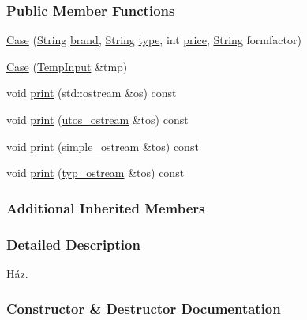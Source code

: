 \subsubsection*{Public Member Functions}
\begin{DoxyCompactItemize}
\item 
\mbox{\hyperlink{class_case_a0d953adffc664636549235d729f13260}{Case}} (\mbox{\hyperlink{class_string}{String}} \mbox{\hyperlink{class_part_ae06f2fdeb7fbbdb229a7aca151f3e341}{brand}}, \mbox{\hyperlink{class_string}{String}} \mbox{\hyperlink{class_part_a101dbcc5c4b21564df7414c7eb0eae88}{type}}, int \mbox{\hyperlink{class_part_a8e71223aed1da95a974f33d8d6c91bb1}{price}}, \mbox{\hyperlink{class_string}{String}} formfactor)
\item 
\mbox{\hyperlink{class_case_a035b7e07200ba4cf72c86a992d95b517}{Case}} (\mbox{\hyperlink{struct_temp_input}{Temp\+Input}} \&tmp)
\item 
void \mbox{\hyperlink{class_case_a9e54f42dcb7b62f1792a6475ce60aa79}{print}} (std\+::ostream \&os) const
\item 
void \mbox{\hyperlink{class_case_ae179519844b825815f4accddafae13b6}{print}} (\mbox{\hyperlink{structutos__ostream}{utos\+\_\+ostream}} \&tos) const
\item 
void \mbox{\hyperlink{class_case_a580b6870ea256cab7e7eee36820803e7}{print}} (\mbox{\hyperlink{structsimple__ostream}{simple\+\_\+ostream}} \&tos) const
\item 
void \mbox{\hyperlink{class_case_a6cce910485e45c0b30018fce491c154f}{print}} (\mbox{\hyperlink{structtyp__ostream}{typ\+\_\+ostream}} \&tos) const
\end{DoxyCompactItemize}
\subsubsection*{Additional Inherited Members}


\subsubsection{Detailed Description}
Ház. 

\subsubsection{Constructor \& Destructor Documentation}
\mbox{\label{class_case_a0d953adffc664636549235d729f13260}} 
